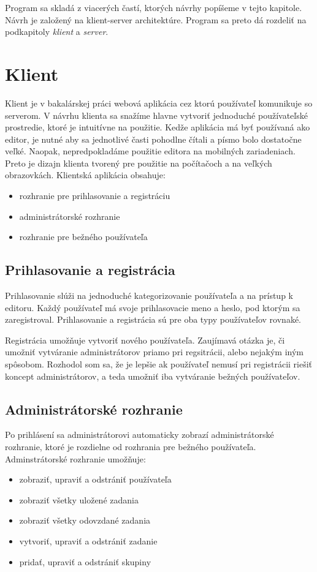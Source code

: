 Program sa skladá z viacerých častí, ktorých návrhy popíšeme v tejto kapitole.
Návrh je založený na klient-server architektúre. Program sa preto dá rozdeliť na 
podkapitoly \textit{klient} a \textit{server}.

\section{Klient}
Klient je v bakalárskej práci webová aplikácia cez ktorú používateľ komunikuje so serverom. V návrhu
klienta sa snažíme hlavne vytvoriť jednoduché používateľské prostredie, ktoré je intuitívne na
použitie. Kedže aplikácia má byť používaná ako editor, je nutné aby sa jednotlivé časti pohodlne
čítali a písmo bolo dostatočne veľké. Naopak, nepredpokladáme použitie editora na mobilných
zariadeniach. Preto je dizajn klienta tvorený pre použitie na počítačoch a na veľkých obrazovkách.
Klientská aplikácia obsahuje:
\begin{itemize}
\item rozhranie pre prihlasovanie a registráciu
\item administrátorské rozhranie
\item rozhranie pre bežného používateľa
\end{itemize}

\subsection{Prihlasovanie a registrácia}
Prihlasovanie slúži na jednoduché kategorizovanie používateľa a na prístup k editoru. Každý
používateľ má svoje prihlasovacie meno a heslo, pod ktorým sa zaregistroval. Prihlasovanie a
registrácia sú pre oba typy používateľov rovnaké.

Registrácia umožňuje vytvoriť nového používateľa. Zaujímavá otázka je, či umožniť vytváranie
administrátorov priamo pri regsitrácii, alebo nejakým iným spôsobom. Rozhodol som sa, že je lepšie
ak používateľ nemusí pri registrácii riešiť koncept administrátorov, a teda umožniť iba vytváranie
bežných používateľov. 

\subsection{Administrátorské rozhranie}
Po prihlásení sa administrátorovi automaticky zobrazí administrátorské rozhranie, ktoré je rozdielne
od rozhrania pre bežného používateľa. Adminstrátorské rozhranie umožňuje:
\begin{itemize}
\item zobraziť, upraviť a odstrániť používateľa
\item zobraziť všetky uložené zadania
\item zobraziť všetky odovzdané zadania
\item vytvoriť, upraviť a odstrániť zadanie
\item pridať, upraviť a odstrániť skupiny
\end{itemize}

